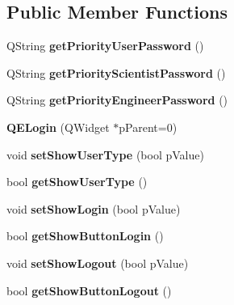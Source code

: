 \subsection*{Public Member Functions}
\begin{DoxyCompactItemize}
\item 
\hypertarget{classQELogin_afb826421547c63a416768cb7f77ea8cc}{
QString {\bfseries getPriorityUserPassword} ()}
\label{classQELogin_afb826421547c63a416768cb7f77ea8cc}

\item 
\hypertarget{classQELogin_a587db3a2efe1c6719bc3e9712bca75bf}{
QString {\bfseries getPriorityScientistPassword} ()}
\label{classQELogin_a587db3a2efe1c6719bc3e9712bca75bf}

\item 
\hypertarget{classQELogin_a1f58b0cd0faf8ad9b523e373204d6682}{
QString {\bfseries getPriorityEngineerPassword} ()}
\label{classQELogin_a1f58b0cd0faf8ad9b523e373204d6682}

\item 
\hypertarget{classQELogin_a5524af2d70794e59b592bfa01edf8232}{
{\bfseries QELogin} (QWidget $\ast$pParent=0)}
\label{classQELogin_a5524af2d70794e59b592bfa01edf8232}

\item 
\hypertarget{classQELogin_af70c19c39cd68e148feb44ea3c3f478c}{
void {\bfseries setShowUserType} (bool pValue)}
\label{classQELogin_af70c19c39cd68e148feb44ea3c3f478c}

\item 
\hypertarget{classQELogin_a4ef5d7c71a38910b754727ba64bb2ab8}{
bool {\bfseries getShowUserType} ()}
\label{classQELogin_a4ef5d7c71a38910b754727ba64bb2ab8}

\item 
\hypertarget{classQELogin_a0928037edcac96a23f18d9e07f2200b5}{
void {\bfseries setShowLogin} (bool pValue)}
\label{classQELogin_a0928037edcac96a23f18d9e07f2200b5}

\item 
\hypertarget{classQELogin_adced91fe4807884e2056eeca262bcf0a}{
bool {\bfseries getShowButtonLogin} ()}
\label{classQELogin_adced91fe4807884e2056eeca262bcf0a}

\item 
\hypertarget{classQELogin_a9deee223b1abf3e02fc403c3f090603d}{
void {\bfseries setShowLogout} (bool pValue)}
\label{classQELogin_a9deee223b1abf3e02fc403c3f090603d}

\item 
\hypertarget{classQELogin_afb3ead74ebd447120bf3c139a35e5427}{
bool {\bfseries getShowButtonLogout} ()}
\label{classQELogin_afb3ead74ebd447120bf3c139a35e5427}


\end{DoxyCompactItemize}
